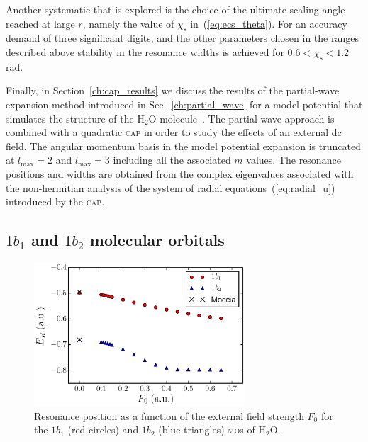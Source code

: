 Another systematic that is explored is the choice of the ultimate
scaling angle reached at large $r$, namely the value of
$\chi_{\mathrm{s}}$ in~(\ref{eq:ecs_theta}). For an accuracy demand of
three significant digits, and the other parameters chosen in the
ranges described above stability in the resonance widths is achieved
for $0.6< \chi_{\mathrm{s}} < 1.2$ rad.

Finally, in Section~\ref{ch:cap_results} we discuss the results of the
partial-wave expansion method introduced in Sec.~\ref{ch:partial_wave}
for a model potential that simulates the structure of the H$_{2}$O
molecule~\cite{illescas_modelV_2011}. The partial-wave approach is
combined with a quadratic \textsc{cap} in order to
study the effects of an external dc field. The angular momentum basis
in the model potential expansion is truncated at $l_{\mathrm{max}} =
2$ and $l_{\mathrm{max}} = 3$ including all the associated $m$
values. The resonance positions and widths are obtained from the
complex eigenvalues associated with the non-hermitian analysis of the
system of radial equations~(\ref{eq:radial_u}) introduced by the
\textsc{cap}.


\subsection{$1b_{1}$ and $1b_{2}$ molecular orbitals}
\label{ch:1b1_1b2_results}


\begin{figure}
  \centering
  \includegraphics[width=0.7\textwidth]{figures/ch_H2O/1b1_1b2/resPositionvsF1b11b2.eps}
  \caption{Resonance position as a function of the external field
    strength $F_{0}$ for the $1b_{1}$ (red circles) and $1b_{2}$ (blue
    triangles) \textsc{mo}s of H$_{2}$O.}
  \label{fig:1b11b2_position}
\end{figure}

